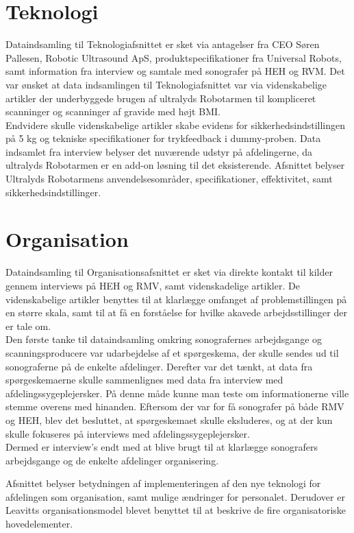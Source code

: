 \section{Teknologi}
Dataindsamling til Teknologiafsnittet er sket via antagelser fra CEO Søren Pallesen, Robotic Ultrasound ApS, produktspecifikationer fra Universal Robots, samt information fra interview og samtale med sonografer på HEH og RVM. Det var ønsket at data indsamlingen til Teknologiafsnittet var via videnskabelige artikler der underbyggede brugen af ultralyds Robotarmen til kompliceret scanninger og scanninger af gravide med højt BMI. \\ 
Endvidere skulle videnskabelige artikler skabe evidens for sikkerhedsindstillingen på 5 kg og tekniske specifikationer for trykfeedback i dummy-proben. Data indsamlet fra interview belyser det nuværende udstyr på afdelingerne, da ultralyds Robotarmen er en add-on løsning til det eksisterende. Afsnittet belyser Ultralyds Robotarmens anvendelsesområder, specifikationer, effektivitet, samt sikkerhedsindstillinger.

\section{Organisation}
Dataindsamling til Organisationsafsnittet er sket via direkte kontakt til kilder gennem interviews på HEH og RMV, samt videnskadelige artikler. De videnskabelige artikler benyttes til at klarlægge omfanget af problemstillingen på en større skala, samt til at få en forståelse for hvilke akavede arbejdsstillinger der er tale om. \\
Den første tanke til dataindsamling omkring sonografernes arbejdsgange og scanningsproducere var udarbejdelse af et spørgeskema, der skulle sendes ud til sonograferne på de enkelte afdelinger. Derefter var det tænkt, at data fra spørgeskemaerne skulle sammenlignes med data fra interview med afdelingssygeplejersker. På denne måde kunne man teste om informationerne ville stemme overens med hinanden. Eftersom der var for få sonografer på både RMV og HEH, blev det besluttet, at spørgeskemaet skulle eksluderes, og at der kun skulle fokuseres på interviews med afdelingssygeplejersker. \\
Dermed er interview's endt med at blive brugt til at klarlægge sonografers arbejdsgange og de enkelte afdelinger organisering. 

Afsnittet belyser betydningen af implementeringen af den nye teknologi for afdelingen som organisation, samt mulige ændringer for personalet. Derudover er Leavitts organisationsmodel blevet benyttet til at beskrive de fire organisatoriske hovedelementer.

